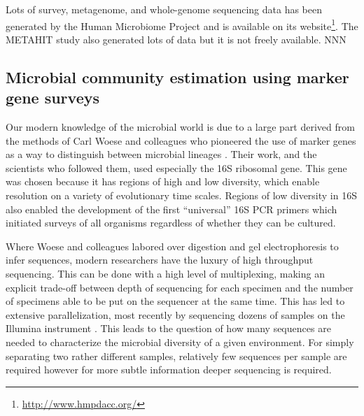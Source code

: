 \documentclass{amsart}
\begin{document}
Lots of survey, metagenome, and whole-genome sequencing data has been generated by the Human Microbiome Project \citep{methe2012framework} and is available on its website\footnote{\url{http://www.hmpdacc.org/}}.
The METAHIT study also generated lots of data but it is not freely available. NNN

\subsection{Microbial community estimation using marker gene surveys}
Our modern knowledge of the microbial world is due to a large part derived from the methods of Carl Woese and colleagues who pioneered the use of marker genes as a way to distinguish between microbial lineages \citep{fox1977comparative}.
Their work, and the scientists who followed them, used especially the 16S ribosomal gene.
This gene was chosen because it has regions of high and low diversity, which enable resolution on a variety of evolutionary time scales.
Regions of low diversity in 16S also enabled the development of the first ``universal'' 16S PCR primers \citep{lane1985rapid} which initiated surveys of all organisms regardless of whether they can be cultured.

Where Woese and colleagues labored over digestion and gel electrophoresis to infer sequences, modern researchers have the luxury of high throughput sequencing.
This can be done with a high level of multiplexing, making an explicit trade-off between depth of sequencing for each specimen and the number of specimens able to be put on the sequencer at the same time.
This has led to extensive parallelization, most recently by sequencing dozens of samples on the Illumina instrument \citep{degnan2011illumina,caporaso2012ultra}.
This leads to the question of how many sequences are needed to characterize the microbial diversity of a given environment.
For simply separating two rather different samples, relatively few sequences per sample are required \citep{kuczynski2010microbial} however for more subtle information deeper sequencing is required.
\end{document}

